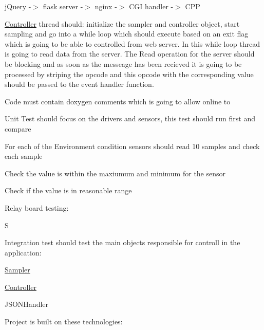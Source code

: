 j\+Query -\/$>$ flask server -\/$>$ nginx -\/$>$ C\+GI handler -\/$>$ C\+PP

\hyperlink{classController}{Controller} thread should\+: initialize the sampler and controller object, start sampling and go into a while loop which should execute based on an exit flag which is going to be able to controlled from web server. In this while loop thread is going to read data from the server. The Read operation for the server should be blocking and as soon as the messeage has been recieved it is going to be processed by striping the opcode and this opcode with the corresponding value should be passed to the event handler function.

Code must contain doxygen comments which is going to allow online to

Unit Test should focus on the drivers and sensors, this test should run first and compare

For each of the Environment condition sensors should read 10 samples and check each sample
\begin{DoxyEnumerate}
\item Check the value is within the maxiumum and minimum for the sensor
\item Check if the value is in reasonable range
\item 
\end{DoxyEnumerate}

Relay board testing\+:
\begin{DoxyEnumerate}
\item S
\end{DoxyEnumerate}

Integration test should test the main objects responsible for controll in the application\+:
\begin{DoxyItemize}
\item \hyperlink{classSampler}{Sampler}
\item \hyperlink{classController}{Controller}
\item J\+S\+O\+N\+Handler
\end{DoxyItemize}

Project is built on these technologies\+:



